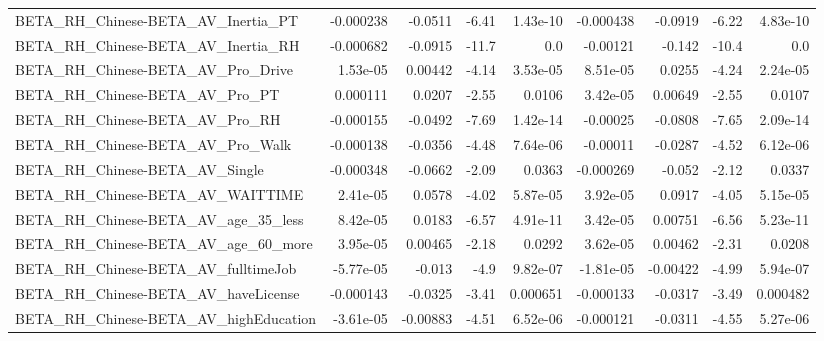 \begin{tabular}{lrrrrrrrr}
BETA\_RH\_Chinese-BETA\_AV\_Inertia\_PT                 &   -0.000238 &      -0.0511 &    -6.41 & 1.43e-10 &  -0.000438 &     -0.0919 &        -6.22 &      4.83e-10 \\
BETA\_RH\_Chinese-BETA\_AV\_Inertia\_RH                 &   -0.000682 &      -0.0915 &    -11.7 &      0.0 &   -0.00121 &      -0.142 &        -10.4 &           0.0 \\
BETA\_RH\_Chinese-BETA\_AV\_Pro\_Drive                  &    1.53e-05 &      0.00442 &    -4.14 & 3.53e-05 &   8.51e-05 &      0.0255 &        -4.24 &      2.24e-05 \\
BETA\_RH\_Chinese-BETA\_AV\_Pro\_PT                     &    0.000111 &       0.0207 &    -2.55 &   0.0106 &   3.42e-05 &     0.00649 &        -2.55 &        0.0107 \\
BETA\_RH\_Chinese-BETA\_AV\_Pro\_RH                     &   -0.000155 &      -0.0492 &    -7.69 & 1.42e-14 &   -0.00025 &     -0.0808 &        -7.65 &      2.09e-14 \\
BETA\_RH\_Chinese-BETA\_AV\_Pro\_Walk                   &   -0.000138 &      -0.0356 &    -4.48 & 7.64e-06 &   -0.00011 &     -0.0287 &        -4.52 &      6.12e-06 \\
BETA\_RH\_Chinese-BETA\_AV\_Single                     &   -0.000348 &      -0.0662 &    -2.09 &   0.0363 &  -0.000269 &      -0.052 &        -2.12 &        0.0337 \\
BETA\_RH\_Chinese-BETA\_AV\_WAITTIME                   &    2.41e-05 &       0.0578 &    -4.02 & 5.87e-05 &   3.92e-05 &      0.0917 &        -4.05 &      5.15e-05 \\
BETA\_RH\_Chinese-BETA\_AV\_age\_35\_less                &    8.42e-05 &       0.0183 &    -6.57 & 4.91e-11 &   3.42e-05 &     0.00751 &        -6.56 &      5.23e-11 \\
BETA\_RH\_Chinese-BETA\_AV\_age\_60\_more                &    3.95e-05 &      0.00465 &    -2.18 &   0.0292 &   3.62e-05 &     0.00462 &        -2.31 &        0.0208 \\
BETA\_RH\_Chinese-BETA\_AV\_fulltimeJob                &   -5.77e-05 &       -0.013 &     -4.9 & 9.82e-07 &  -1.81e-05 &    -0.00422 &        -4.99 &      5.94e-07 \\
BETA\_RH\_Chinese-BETA\_AV\_haveLicense                &   -0.000143 &      -0.0325 &    -3.41 & 0.000651 &  -0.000133 &     -0.0317 &        -3.49 &      0.000482 \\
BETA\_RH\_Chinese-BETA\_AV\_highEducation              &   -3.61e-05 &     -0.00883 &    -4.51 & 6.52e-06 &  -0.000121 &     -0.0311 &        -4.55 &      5.27e-06 \\

\end{tabular}
